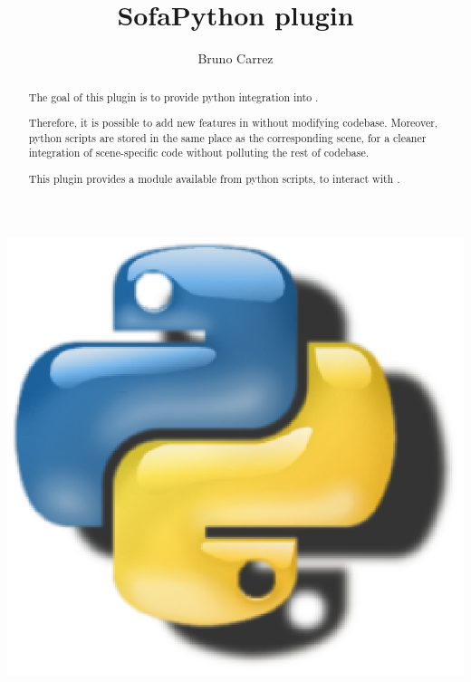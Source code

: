 \documentclass{article}
\begin{document}
\raggedright

\title{SofaPython plugin}
\author{Bruno Carrez}



\maketitle

\begin{abstract}
The goal of this plugin is to provide python integration into \sofa. 

Therefore, it is possible to add new features in \sofa without modifying \sofa codebase. Moreover, python scripts are stored in the same place as the corresponding scene, for a cleaner integration of scene-specific code without polluting the rest of \sofa codebase.

This plugin provides a  module available from python scripts, to interact with \sofa. 
\end{abstract}

\begin{center}
\includegraphics{SofaPython.eps}
\end{center}

%






\end{document}
